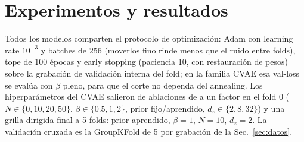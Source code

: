 \documentclass[conference,a4paper]{IEEEtran}
\begin{document}

\section{Experimentos y resultados}\label{sec:resultados}

Todos los modelos comparten el protocolo de optimización: Adam con
learning rate $10^{-3}$ y batches de 256 (moverlos fino rinde menos que el
ruido entre folds), tope de 100 épocas y early stopping (paciencia 10, con
restauración de pesos) sobre la grabación de validación interna del fold;
en la familia CVAE esa val-loss se evalúa con $\beta$ pleno, para que el
corte no dependa del annealing. Los hiperparámetros del CVAE salieron de
ablaciones de a un factor en el fold 0 ($N \in \{0,10,20,50\}$, $\beta \in
\{0.5,1,2\}$, prior fijo/aprendido, $d_z \in \{2,8,32\}$) y una grilla
dirigida final a 5 folds: prior aprendido, $\beta=1$, $N=10$, $d_z=2$. La
validación cruzada es la GroupKFold de 5 por grabación de la
Sec.~\ref{sec:datos}.
\end{document}
